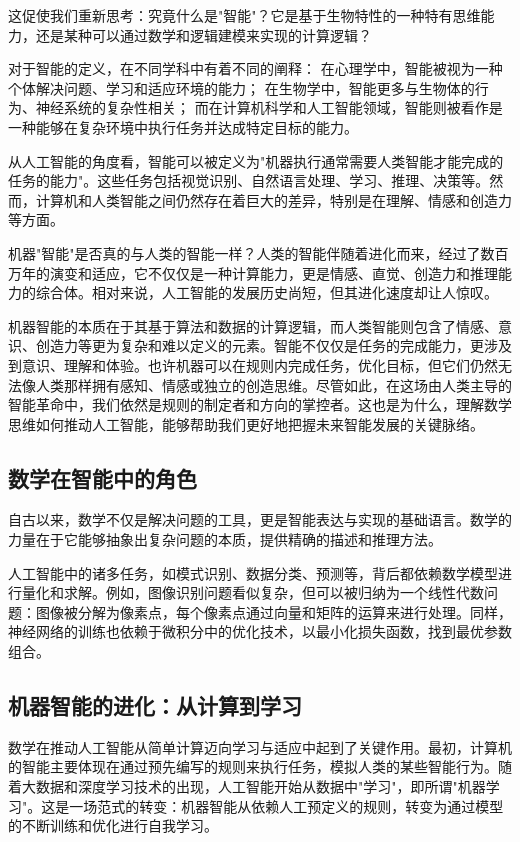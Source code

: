 这促使我们重新思考：究竟什么是"智能"？它是基于生物特性的一种特有思维能力，还是某种可以通过数学和逻辑建模来实现的计算逻辑？

对于智能的定义，在不同学科中有着不同的阐释：
在心理学中，智能被视为一种个体解决问题、学习和适应环境的能力；
在生物学中，智能更多与生物体的行为、神经系统的复杂性相关；
而在计算机科学和人工智能领域，智能则被看作是一种能够在复杂环境中执行任务并达成特定目标的能力。

从人工智能的角度看，智能可以被定义为"机器执行通常需要人类智能才能完成的任务的能力"。这些任务包括视觉识别、自然语言处理、学习、推理、决策等。然而，计算机和人类智能之间仍然存在着巨大的差异，特别是在理解、情感和创造力等方面。

机器"智能"是否真的与人类的智能一样？人类的智能伴随着进化而来，经过了数百万年的演变和适应，它不仅仅是一种计算能力，更是情感、直觉、创造力和推理能力的综合体。相对来说，人工智能的发展历史尚短，但其进化速度却让人惊叹。

机器智能的本质在于其基于算法和数据的计算逻辑，而人类智能则包含了情感、意识、创造力等更为复杂和难以定义的元素。智能不仅仅是任务的完成能力，更涉及到意识、理解和体验。也许机器可以在规则内完成任务，优化目标，但它们仍然无法像人类那样拥有感知、情感或独立的创造思维。尽管如此，在这场由人类主导的智能革命中，我们依然是规则的制定者和方向的掌控者。这也是为什么，理解数学思维如何推动人工智能，能够帮助我们更好地把握未来智能发展的关键脉络。

\subsection*{数学在智能中的角色}

自古以来，数学不仅是解决问题的工具，更是智能表达与实现的基础语言。数学的力量在于它能够抽象出复杂问题的本质，提供精确的描述和推理方法。

人工智能中的诸多任务，如模式识别、数据分类、预测等，背后都依赖数学模型进行量化和求解。例如，图像识别问题看似复杂，但可以被归纳为一个线性代数问题：图像被分解为像素点，每个像素点通过向量和矩阵的运算来进行处理。同样，神经网络的训练也依赖于微积分中的优化技术，以最小化损失函数，找到最优参数组合。

\subsection*{机器智能的进化：从计算到学习}

数学在推动人工智能从简单计算迈向学习与适应中起到了关键作用。最初，计算机的智能主要体现在通过预先编写的规则来执行任务，模拟人类的某些智能行为。随着大数据和深度学习技术的出现，人工智能开始从数据中"学习"，即所谓"机器学习"。这是一场范式的转变：机器智能从依赖人工预定义的规则，转变为通过模型的不断训练和优化进行自我学习。

